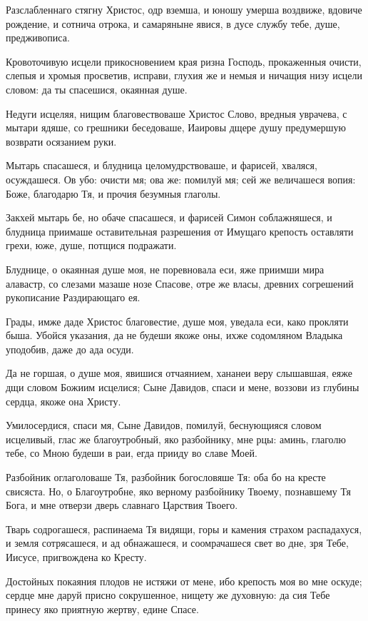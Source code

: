 Разслабленнаго стягну Христос, одр вземша, и юношу умерша воздвиже, вдовиче рождение, и сотнича отрока, и самаряныне явися, в дусе службу тебе, душе, предживописа.

Кровоточивую исцели прикосновением края ризна Господь, прокаженныя очисти, слепыя и хромыя просветив, исправи, глухия же и немыя и ничащия низу исцели словом: да ты спасешися, окаянная душе.

Недуги исцеляя, нищим благовествоваше Христос Слово, вредныя уврачева, с мытари ядяше, со грешники беседоваше, Иаировы дщере душу предумершую возврати осязанием руки.

Мытарь спасашеся, и блудница целомудрствоваше, и фарисей, хваляся, осуждашеся. Ов убо: очисти мя; ова же: помилуй мя; сей же величашеся вопия: Боже, благодарю Тя, и прочия безумныя глаголы.

Закхей мытарь бе, но обаче спасашеся, и фарисей Симон соблажняшеся, и блудница приимаше оставительная разрешения от Имущаго крепость оставляти грехи, юже, душе, потщися подражати.

Блуднице, о окаянная душе моя, не поревновала еси, яже приимши мира алавастр, со слезами мазаше нозе Спасове, отре же власы, древних согрешений рукописание Раздирающаго ея.

Грады, имже даде Христос благовестие, душе моя, уведала еси, како прокляти быша. Убойся указания, да не будеши якоже оны, ихже содомляном Владыка уподобив, даже до ада осуди.

Да не горшая, о душе моя, явишися отчаянием, хананеи веру слышавшая, еяже дщи словом Божиим исцелися; Сыне Давидов, спаси и мене, воззови из глубины сердца, якоже она Христу.

Умилосердися, спаси мя, Сыне Давидов, помилуй, беснующияся словом исцеливый, глас же благоутробный, яко разбойнику, мне рцы: аминь, глаголю тебе, со Мною будеши в раи, егда прииду во славе Моей.

Разбойник оглаголоваше Тя, разбойник богословяше Тя: оба бо на кресте свисяста. Но, о Благоутробне, яко верному разбойнику Твоему, познавшему Тя Бога, и мне отверзи дверь славнаго Царствия Твоего.

Тварь содрогашеся, распинаема Тя видящи, горы и камения страхом распадахуся, и земля сотрясашеся, и ад обнажашеся, и соомрачашеся свет во дне, зря Тебе, Иисусе, пригвождена ко Кресту.

Достойных покаяния плодов не истяжи от мене, ибо крепость моя во мне оскуде; сердце мне даруй присно сокрушенное, нищету же духовную: да сия Тебе принесу яко приятную жертву, едине Спасе.

